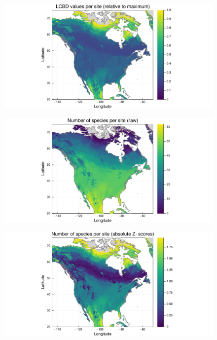 \documentclass[10pt]{beamer}
\begin{document}
\begin{frame}
  \begin{figure}
    \centering
    \includegraphics[scale=0.4]{fig/lcbd-am-larger2.pdf}
  \end{figure}
\end{frame}

\begin{frame}
  \begin{figure}
    \centering
    \includegraphics[scale=0.4]{fig/richness-am-larger2.pdf}
  \end{figure}
\end{frame}

\begin{frame}
  \begin{figure}
    \centering
    \includegraphics[scale=0.4]{fig/richness-am-larger2-zscores.pdf}
  \end{figure}
\end{frame}
\end{document}
